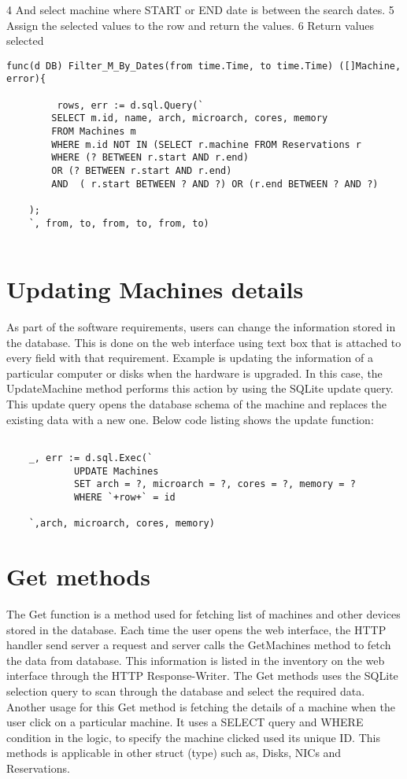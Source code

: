 4 And  select machine where START or END date is between the search dates.
5 Assign the selected values to the row and return the values.
6 Return values selected 
\begin{lstlisting}[caption=Searching available, label=Search available machine]
func(d DB) Filter_M_By_Dates(from time.Time, to time.Time) ([]Machine, error){

         rows, err := d.sql.Query(`
		SELECT m.id, name, arch, microarch, cores, memory
		FROM Machines m
		WHERE m.id NOT IN (SELECT r.machine FROM Reservations r
		WHERE (? BETWEEN r.start AND r.end)
		OR (? BETWEEN r.start AND r.end)
		AND  ( r.start BETWEEN ? AND ?) OR (r.end BETWEEN ? AND ?)
	
	);	
	`, from, to, from, to, from, to)


\end{lstlisting}
\section*{Updating Machines details}
As part of the software requirements, users can change the information stored in the database. This is done on the web interface using text box that is attached to every field with that requirement. Example is updating the information of a particular computer or disks when the hardware is upgraded. In this case, the UpdateMachine method performs this action by using the SQLite update query. This update query opens the database schema of the machine and replaces the existing data with a new one.
Below code listing shows the update function:
\begin{lstlisting}[caption=Function for Updating data, label=Update function]

	_, err := d.sql.Exec(`
			UPDATE Machines
			SET arch = ?, microarch = ?, cores = ?, memory = ?
			WHERE `+row+` = id

	`,arch, microarch, cores, memory)

\end{lstlisting}
\section{Get methods}
The Get function is a method used for fetching list of machines and other devices stored in the database. Each time the user opens the web interface, the HTTP handler send server a request and server calls the GetMachines method to fetch the data from database. This information is listed in the inventory on the web interface through the HTTP Response-Writer. The Get methods uses the SQLite selection query to scan through the database and select the required data.  Another usage for this Get method is fetching the details of a machine when the user click on a particular machine. It uses a SELECT query and WHERE condition in the logic, to specify the machine clicked used its unique ID. This methods is applicable in other struct (type) such as, Disks, NICs and Reservations. 
 
